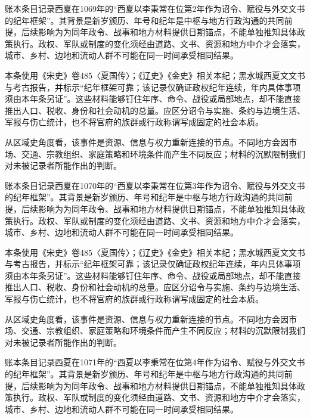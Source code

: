 账本条目记录西夏在1069年的“西夏以李秉常在位第2年作为诏令、赋役与外交文书的纪年框架”。其背景是新岁颁历、年号和纪年是中枢与地方行政沟通的共同前提，后续影响为为同年政令、战事和地方材料提供日期锚点，不能单独推知具体政策执行。政权、军队或制度的变化须经由道路、文书、资源和地方中介才会落实，城市、乡村、边地和流动人群不可能在同一时间承受相同结果。

本条使用《宋史》卷485〈夏国传〉；《辽史》《金史》相关本纪；黑水城西夏文文书与考古报告，并标示“纪年框架可靠；该记录仅确证政权纪年连续，年内具体事项须由本年条另证”。这些材料能够钉住年序、命令、战役或局部地点，却不能直接推出人口、税收、身份和社会动机的总量。应区分诏令与实施、条约与边境生活、军报与伤亡统计，也不将官府的族群或行政称谓写成固定的社会本质。

从区域史角度看，该事件是资源、信息与权力重新连接的节点。不同地方会因市场、交通、宗教组织、家庭策略和环境条件而产生不同反应；材料的沉默限制我们对未被记录者所能作出的判断。

账本条目记录西夏在1070年的“西夏以李秉常在位第3年作为诏令、赋役与外交文书的纪年框架”。其背景是新岁颁历、年号和纪年是中枢与地方行政沟通的共同前提，后续影响为为同年政令、战事和地方材料提供日期锚点，不能单独推知具体政策执行。政权、军队或制度的变化须经由道路、文书、资源和地方中介才会落实，城市、乡村、边地和流动人群不可能在同一时间承受相同结果。

本条使用《宋史》卷485〈夏国传〉；《辽史》《金史》相关本纪；黑水城西夏文文书与考古报告，并标示“纪年框架可靠；该记录仅确证政权纪年连续，年内具体事项须由本年条另证”。这些材料能够钉住年序、命令、战役或局部地点，却不能直接推出人口、税收、身份和社会动机的总量。应区分诏令与实施、条约与边境生活、军报与伤亡统计，也不将官府的族群或行政称谓写成固定的社会本质。

从区域史角度看，该事件是资源、信息与权力重新连接的节点。不同地方会因市场、交通、宗教组织、家庭策略和环境条件而产生不同反应；材料的沉默限制我们对未被记录者所能作出的判断。

账本条目记录西夏在1071年的“西夏以李秉常在位第4年作为诏令、赋役与外交文书的纪年框架”。其背景是新岁颁历、年号和纪年是中枢与地方行政沟通的共同前提，后续影响为为同年政令、战事和地方材料提供日期锚点，不能单独推知具体政策执行。政权、军队或制度的变化须经由道路、文书、资源和地方中介才会落实，城市、乡村、边地和流动人群不可能在同一时间承受相同结果。

